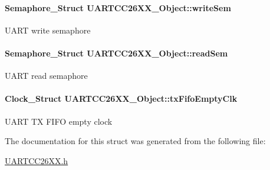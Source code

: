 \paragraph[{write\+Sem}]{\setlength{\rightskip}{0pt plus 5cm}Semaphore\+\_\+\+Struct U\+A\+R\+T\+C\+C26\+X\+X\+\_\+\+Object\+::write\+Sem}\label{struct_u_a_r_t_c_c26_x_x___object_a216c349e650909bd84072c076051117d}
U\+A\+R\+T write semaphore 
\paragraph[{read\+Sem}]{\setlength{\rightskip}{0pt plus 5cm}Semaphore\+\_\+\+Struct U\+A\+R\+T\+C\+C26\+X\+X\+\_\+\+Object\+::read\+Sem}\label{struct_u_a_r_t_c_c26_x_x___object_ab81ce13969ecc77d764000ea53fb23d2}
U\+A\+R\+T read semaphore 
\paragraph[{tx\+Fifo\+Empty\+Clk}]{\setlength{\rightskip}{0pt plus 5cm}Clock\+\_\+\+Struct U\+A\+R\+T\+C\+C26\+X\+X\+\_\+\+Object\+::tx\+Fifo\+Empty\+Clk}\label{struct_u_a_r_t_c_c26_x_x___object_a97be7390556f78f9361505c4ee860469}
U\+A\+R\+T T\+X F\+I\+F\+O empty clock 

The documentation for this struct was generated from the following file\+:\begin{DoxyCompactItemize}
\item 
\hyperlink{_u_a_r_t_c_c26_x_x_8h}{U\+A\+R\+T\+C\+C26\+X\+X.\+h}\end{DoxyCompactItemize}
